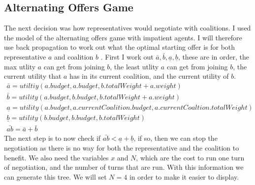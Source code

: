 \subsection{Alternating Offers Game}
The next decision was how representatives would negotiate with coalitions. I used the model of the alternating offers game with impatient agents. I will therefore use back propagation to work out what the optimal starting offer is for both representative $a$ and coalition $b$ . First I work out  $ \bar{a}, \bar{b}, \underline{a}, \underline{b} $, these are in order, the max utlity $a$ can get from joining $b$, the least utlity $a$ can get from joining $b$, the current utility that $a$ has in its current coalition, and the current utility of $b$.
\begin{gather*}
\bar{a} = utiltiy(a.budget,a.budget,b.totalWeight +  a.weight) \\
\bar{b} = utility(a.budget,b.budget,b.totalWeight +  a.weight) \\
\underline{a} = utility(a.budget,a.currentCoalition.budget,a.currentCoaltion.totalWeight) \\
\underline{b} = utility(b.budget,b.budget,b.totalWeight) \\ 
\bar{ab} = \bar{a} + \bar{b} 
\end{gather*}
The next step is to now check if  $\bar{ab} < \underline{a} + \underline{b}$, if so, then we can stop the negotiation as there is no way for both the representative and the coalition to benefit. We also need the variables $x$ and $N$, which are the cost to run one turn of negotiation, and the number of turns that are run. With this information we can generate this tree. We will set $N = 4$ in order to make it easier to display.
\\

